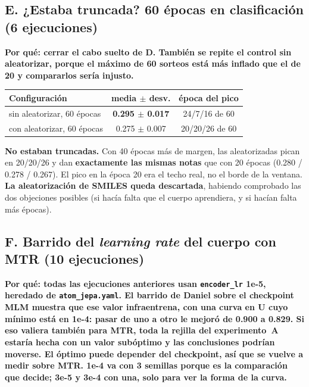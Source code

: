 \documentclass[11pt,a4paper]{article}
\newcommand{\var}[1]{\texttt{#1}}
\newcommand{\exper}[2]{\subsection*{#1}\noindent\textbf{\small\textcolor{dtured}{#2}}\par\smallskip}
\begin{document}
\exper{E. ¿Estaba truncada? 60 épocas en clasificación (6 ejecuciones)}
{Por qué: cerrar el cabo suelto de D. También se repite el control sin aleatorizar, porque el máximo de 60 sorteos está más inflado que el de 20 y compararlos sería injusto.}

\begin{center}
\begin{tabular}{lcc}
\toprule
Configuración & media $\pm$ desv. & época del pico \\ \midrule
sin aleatorizar, 60 épocas & \textbf{0.295 $\pm$ 0.017} & 24/7/16 de 60 \\
con aleatorizar, 60 épocas & 0.275 $\pm$ 0.007 & 20/20/26 de 60 \\
\bottomrule
\end{tabular}
\end{center}

\begin{concl}
\textbf{No estaban truncadas.} Con 40 épocas más de margen, las aleatorizadas pican en 20/20/26 y dan
\textbf{exactamente las mismas notas} que con 20 épocas (0.280 / 0.278 / 0.267). El pico en la época
20 era el techo real, no el borde de la ventana.
\textbf{La aleatorización de SMILES queda descartada}, habiendo comprobado las dos objeciones
posibles (si hacía falta que el cuerpo aprendiera, y si hacían falta más épocas).
\end{concl}

\exper{F. Barrido del \emph{learning rate} del cuerpo con MTR (10 ejecuciones)}
{Por qué: todas las ejecuciones anteriores usan \var{encoder\_lr} 1e-5, heredado de \var{atom\_jepa.yaml}. El barrido de Daniel sobre el checkpoint \textbf{MLM} muestra que ese valor infraentrena, con una curva en U cuyo mínimo está en 1e-4: pasar de uno a otro le mejoró de 0.900 a 0.829. Si eso valiera también para MTR, toda la rejilla del experimento~A estaría hecha con un valor subóptimo y las conclusiones podrían moverse. El óptimo puede depender del checkpoint, así que se vuelve a medir sobre MTR. 1e-4 va con \textbf{3 semillas} porque es la comparación que decide; 3e-5 y 3e-4 con una, solo para ver la forma de la curva.}
\end{document}
